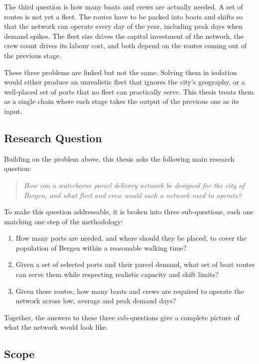 \documentclass[12pt]{article}
\begin{document}
The third question is how many boats and crews are actually needed. A set of routes is not yet a fleet. The routes have to be packed into boats and shifts so that the network can operate every day of the year, including peak days when demand spikes. The fleet size drives the capital investment of the network, the crew count drives its labour cost, and both depend on the routes coming out of the previous stage.

These three problems are linked but not the same. Solving them in isolation would either produce an unrealistic fleet that ignores the city's geography, or a well-placed set of ports that no fleet can practically serve. This thesis treats them as a single chain where each stage takes the output of the previous one as its input.

\subsection{Research Question}
\label{subsec:research-question}

Building on the problem above, this thesis asks the following main research question:

\begin{quote}
  \textit{How can a waterborne parcel delivery network be designed for the city of Bergen, and what fleet and crew would such a network need to operate?}
\end{quote}

To make this question addressable, it is broken into three sub-questions, each one matching one step of the methodology:

\begin{enumerate}
  \item How many ports are needed, and where should they be placed, to cover the population of Bergen within a reasonable walking time?
  \item Given a set of selected ports and their parcel demand, what set of boat routes can serve them while respecting realistic capacity and shift limits?
  \item Given these routes, how many boats and crews are required to operate the network across low, average and peak demand days?
\end{enumerate}

Together, the answers to these three sub-questions give a complete picture of what the network would look like.

\subsection{Scope}
\label{subsec:scope}
\end{document}
